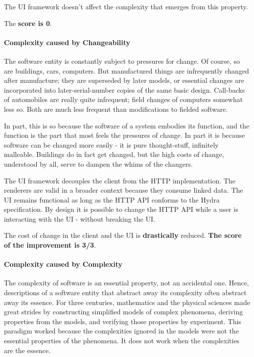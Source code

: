 The UI framework doesn't affect the complexity that emerges from this property.

The \textbf{score is 0}.

\paragraph{Complexity caused by Changeability}
The software entity is constantly subject to pressures for change. Of course, so are buildings, cars, computers. But manufactured things are infrequently changed after manufacture; they are superseded by later models, or essential changes are incorporated into later-serial-number copies of the same basic design. Call-backs of automobiles are really quite infrequent; field changes of computers somewhat less so. Both are much less frequent than modifications to fielded software.

In part, this is so because the software of a system embodies its function, and the function is the part that most feels the pressures of change. In part it is because software can be changed more easily - it is pure thought-stuff, infinitely malleable. Buildings do in fact get changed, but the high costs of change, understood by all, serve to dampen the whims of the changers. \citep{nosilverbullet}

The UI framework decouples the client from the HTTP implementation. The renderers are valid in a broader context because they consume linked data. The UI remains functional as long as the HTTP API conforms to the Hydra specification. By design it is possible to change the HTTP API while a user is interacting with the UI - without breaking the UI.

The cost of change in the client and the UI is \textbf{drastically} reduced. \textbf{The score of the improvement is 3/3}.

\paragraph{Complexity caused by Complexity}
The complexity of software is an essential property, not an accidental one. Hence, descriptions of a software entity that abstract away its complexity often abstract away its essence. For three centuries, mathematics and the physical sciences made great strides by constructing simplified models of complex phenomena, deriving properties from the models, and verifying those properties by experiment. This paradigm worked because the complexities ignored in the models were not the essential properties of the phenomena. It does not work when the complexities are the essence. \citep{nosilverbullet}


